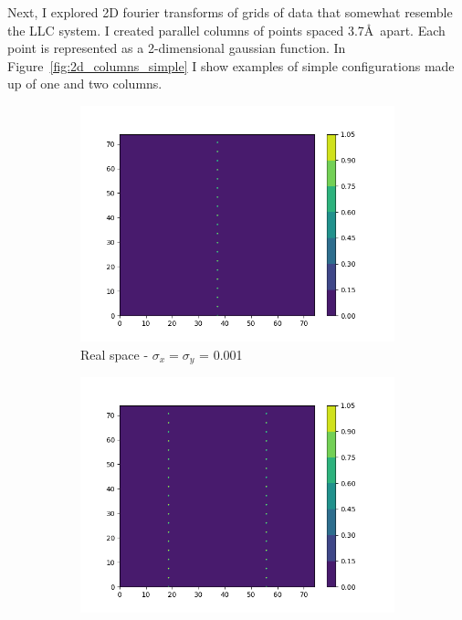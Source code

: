 \documentclass{article}
\begin{document}
Next, I explored 2D fourier transforms of grids of data that somewhat resemble 
the LLC system. I created parallel columns of points spaced 3.7\AA~apart. Each
point is represented as a 2-dimensional gaussian function. In Figure~\ref{fig:2d_columns_simple}
I show examples of simple configurations made up of one and two columns. 

\begin{figure}
	\begin{subfigure}{0.45\textwidth}
	        \centering
                \includegraphics[width=\textwidth]{real_2d_1column.png}
                \caption{Real space - $\sigma_x=\sigma_y$ = 0.001}\label{fig:real_2d_1column}
        \end{subfigure}
        \begin{subfigure}{0.45\textwidth}
                \centering
                \includegraphics[width=\textwidth]{real_2d_2column.png}

\end{subfigure}
\end{figure}
\end{document}
